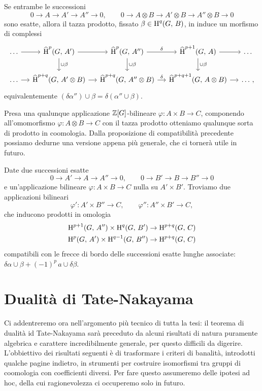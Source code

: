 \begin{proposition}
	Se entrambe le successioni
	\[ 0 \to A \to A' \to A'' \to 0, \qquad 0 \to A \otimes B \to A'\otimes B \to A''\otimes B \to 0 \]
	sono esatte, allora il tazza prodotto, fissato $ \beta \in \operatorname{H}^q(G, \, B) $, in induce un morfismo di complessi
	\[\begin{tikzcd}[column sep = small]
	\dots \rar
	& \Hh^{p}(G, \, A') \dar["\cup\beta"] \rar 
	& \Hh^{p}(G, \, A'') \rar["\delta"] \dar["\cup\beta"]
	& \Hh^{p+1}(G, \, A) \rar \dar["\cup\beta"]
	&\dots  \\
	\dots \rar
	& \Hh^{p+q}(G, \, A'\otimes B) \rar
	& \Hh^{p+q}(G, \, A''\otimes B) \rar["\delta"]
	& \Hh^{p+q+1}(G, \, A\otimes B) \rar &\dots \, , \end{tikzcd}\]
	equivalentemente $ (\delta\alpha'') \cup \beta = \delta (\alpha'' \cup \beta) $.
\end{proposition}

Presa una qualunque applicazione $ \mathbb{Z}[G] $-bilineare $ \varphi\colon A \times B \to C $, componendo all'omomorfismo $ \varphi\colon A \otimes B \to C  $ con il tazza prodotto otteniamo qualunque sorta di prodotto in coomologia. Dalla proposizione di compatibilità precedente possiamo dedurne una versione appena più generale, che ci tornerà utile in futuro.

\begin{lemma}
	Date due successioni esatte
	\[ 0 \to A' \to A \to A'' \to 0, \qquad 0 \to B' \to B \to B'' \to 0 \]
	e un'applicazione bilineare $  \varphi\colon A \times B \to C $ nulla su $ A'\times B' $. Troviamo due applicazioni bilineari
	\[ \varphi'\colon A' \times B'' \to C, \qquad \varphi''\colon A'' \times B' \to C, \]
	che inducono prodotti in omologia
	\begin{align*}
		\operatorname{H}^{p+1}(G, \, A'') \times \operatorname{H}^{q}(G, \, B') &\to \operatorname{H}^{p+q}(G, \, C)\\
		\operatorname{H}^{p}(G, \, A') \times \operatorname{H}^{q-1}(G, \, B'') &\to \operatorname{H}^{p+q}(G, \, C)
	\end{align*}
	compatibili con le frecce di bordo delle successioni esatte lunghe associate:  $ \delta \alpha \cup \beta + (-1)^p \, a \cup \delta \beta $.
\end{lemma}

\section{Dualità di Tate-Nakayama}
Ci addentreremo ora nell'argomento più tecnico di tutta la tesi: il teorema di dualità id Tate-Nakayama sarà preceduto da alcuni risultati di natura puramente algebrica e carattere incredibilmente generale, per questo difficili da digerire. L'obbiettivo dei risultati seguenti è di trasformare i criteri di banalità, introdotti qualche pagine indietro, in strumenti per costruire isomorfismi tra gruppi di coomologia con coefficienti diversi. Per fare questo assumeremo delle ipotesi ad hoc, della cui ragionevolezza ci occuperemo solo in futuro. 

